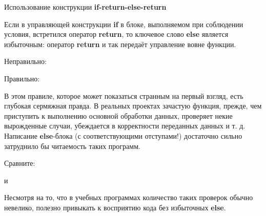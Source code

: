 \begin{typerror}
	Использование конструкции \textbf{if-return-else-return}

	Если в управляющей конструкции \textbf{if} в блоке, выполняемом при соблюдении условия, встретился оператор \textbf{return}, то ключевое слово \textbf{else} является избыточным: оператор \textbf{return} и так передаёт управление вовне функции.

	Неправильно:

	Правильно:

	В этом правиле, которое может показаться странным на первый взгляд, есть глубокая сермяжная правда.
	В реальных проектах зачастую функция, прежде, чем приступить к выполнению основной обработки данных, проверяет некие вырожденные случаи, убеждается в корректности переданных данных и т. д.
	Написание \textbf{else}-блока (с соответствующими отступами!) достаточно сильно затруднило бы читаемость таких программ.

	Сравните:

	и


	Несмотря на то, что в учебных программах количество таких проверок обычно невелико, полезно привыкать к восприятию кода без избыточных \textbf{else}. 

	

	
\end{typerror}
